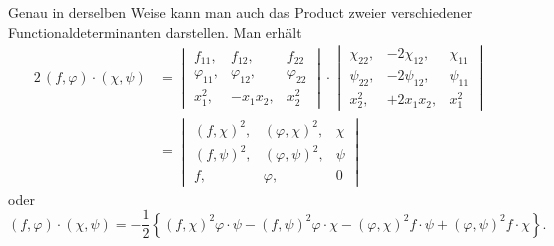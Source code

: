\documentclass[11pt]{article}
\providecommand{\weberpage}[1]{}
\providecommand{\weq}[2]{\begin{equation}\tag{#1}#2\end{equation}}
\begin{document}
Genau in derselben Weise kann man auch das Product zweier verschiedener Functionaldeterminanten darstellen. Man erhält
\[
\begin{aligned}
2\,(f, \varphi)\cdot(\chi, \psi) &= \begin{vmatrix} f_{11}, & f_{12}, & f_{22} \\ \varphi_{11}, & \varphi_{12}, & \varphi_{22} \\ x_1^2, & -x_1x_2, & x_2^2 \end{vmatrix} \cdot \begin{vmatrix} \chi_{22}, & -2\chi_{12}, & \chi_{11} \\ \psi_{22}, & -2\psi_{12}, & \psi_{11} \\ x_2^2, & +2x_1x_2, & x_1^2 \end{vmatrix} \\
&= \begin{vmatrix} (f, \chi)^2, & (\varphi, \chi)^2, & \chi \\ (f, \psi)^2, & (\varphi, \psi)^2, & \psi \\ f, & \varphi, & 0 \end{vmatrix}
\end{aligned}
\]
oder
\weq{II}{(f, \varphi)\cdot(\chi, \psi) = -\frac{1}{2}\left\{(f, \chi)^2\varphi\cdot\psi - (f, \psi)^2\varphi\cdot\chi - (\varphi, \chi)^2 f\cdot\psi + (\varphi, \psi)^2 f\cdot\chi\right\}.}


\weberpage{53}
\end{document}
